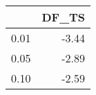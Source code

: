 \begin{tabular}{lr}
\toprule
{} &  DF\_TS \\
\midrule
0.01 &  -3.44 \\
0.05 &  -2.89 \\
0.10 &  -2.59 \\
\bottomrule
\end{tabular}
